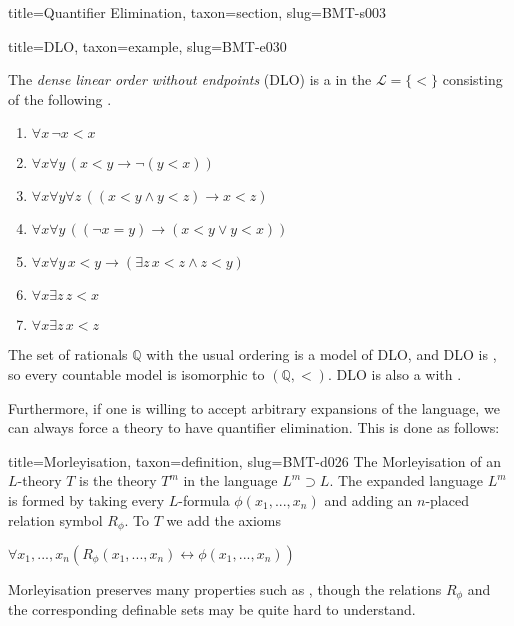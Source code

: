 \documentclass[a4paper]{article}
\begin{document}
\begin{tree}{title={Quantifier Elimination}, taxon={section}, slug={BMT-s003}}
  
  
\begin{tree}{title={DLO}, taxon={example}, slug={BMT-e030}}

    The \emph{dense linear order without endpoints} (DLO) is a  in the  \(\mathcal  L= \{ < \}\)
    consisting of the following .
    \begin{enumerate}
\item{\(\forall  x \, \neg  x<x\)}
        \item{\(\forall  x \forall  y \, (x<y \rightarrow \neg (y<x))\)}
        \item{\(\forall  x \forall  y \forall  z \, ((x<y \land  y<z) \rightarrow  x<z)\)}
        \item{\(\forall  x \forall  y \, (( \neg  x=y) \rightarrow (x<y \lor  y<x))\)}
        \item{\(\forall  x \forall  y \, x<y \rightarrow ( \exists  z \, x<z \land  z<y)\)}
        \item{\(\forall  x \exists  z \, z<x\)}
        \item{\(\forall  x \exists  z \, x<z\)}
\end{enumerate}\par{
    The set of rationals \(\mathbb  Q\) with the usual ordering is a model of DLO, and DLO is ,
    so every countable model is isomorphic to \(( \mathbb  Q,<)\). DLO is also a  with
    .
}
\end{tree}

\par{Furthermore, if one is willing to accept arbitrary expansions of the language, we can always force a theory to have quantifier elimination. This is done as follows:}
\begin{tree}{title={Morleyisation}, taxon={definition}, slug={BMT-d026}}
 The Morleyisation of an \(L\)-theory \(T\) is the theory \(T^m\) in the language \(L^m \supset  L\). The expanded language \(L^m\) is formed by taking every \(L\)-formula \(\phi (x_1,...,x_n)\) and adding an \(n\)-placed relation symbol \(R_ \phi\). To \(T\) we add the axioms \par{\(\forall  x_1,...,x_n (R_ \phi  (x_1,...,x_n) \leftrightarrow \phi (x_1,...,x_n)) \)}\par{Morleyisation preserves many properties such as , though the relations \(R_ \phi\) and the corresponding definable sets may be quite hard to understand. }
\end{tree}

\end{tree}
\end{document}
